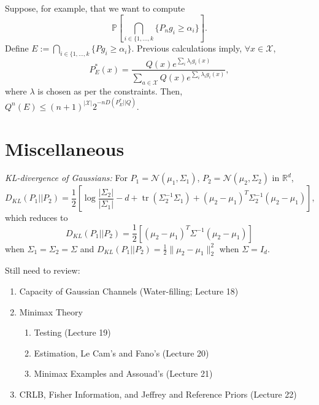 \documentclass{article}
\newcommand{\inv}{^{-1}}                            %
\newcommand{\R}{\mathbb{R}}                         %
\newcommand{\X}{\mathcal{X}}                        %
\newcommand{\pr}{\mathbb{P}}                        %
\newcommand{\tr}{\operatorname{tr}}                 %
\begin{document}
Suppose, for example, that we want to compute
\[\pr\left[ \bigcap_{i \in \{1,\dots,k} \{P_n g_i \geq \alpha_i\} \right].\]
Define $E := \bigcap_{i \in \{1,\dots,k} \{P g_i \geq \alpha_i\}$. Previous
calculations imply, $\forall x \in \X$,
\[P_E^*(x) = \frac{Q(x)e^{\sum_i \lambda_i g_i(x)}}
                            {\sum_{a \in \X}Q(x)e^{\sum_i \lambda_i g_i(x)}},\]
where $\lambda$ is chosen as per the constraints. Then,
$Q^n(E) \leq (n + 1)^{|\X|}2^{-n D(P_E^*||Q)}$.

\section{Miscellaneous}
\emph{KL-divergence of Gaussians:}
For $P_1 = \mathcal{N}(\mu_1, \Sigma_1)$, $P_2 = \mathcal{N}(\mu_2, \Sigma_2)$
in $\R^d$,
\[D_{KL}(P_1||P_2)
    = \frac{1}{2} \left[ \log \frac{|\Sigma_2|}{|\Sigma_1|}
        - d + \tr(\Sigma_2\inv\Sigma_1)
            + (\mu_2 - \mu_1)^T\Sigma_2\inv(\mu_2 - \mu_1)\right],\]
which reduces to
\[D_{KL}(P_1||P_2)
    = \frac{1}{2} \left[ (\mu_2 - \mu_1)^T\Sigma\inv(\mu_2 - \mu_1)\right]\]
when $\Sigma_1 = \Sigma_2 = \Sigma$ and
$D_{KL}(P_1||P_2) = \frac{1}{2} \|\mu_2 - \mu_1\|_2^2$ when $\Sigma = I_d$.

Still need to review:
\begin{enumerate}
\item Capacity of Gaussian Channels (Water-filling; Lecture 18)
\item Minimax Theory
\begin{enumerate}
\item Testing (Lecture 19)
\item Estimation, Le Cam's and Fano's (Lecture 20)
\item Minimax Examples and Assouad's (Lecture 21)
\end{enumerate}
\item CRLB, Fisher Information, and Jeffrey and Reference Priors (Lecture 22)
\end{enumerate}
\end{document}
